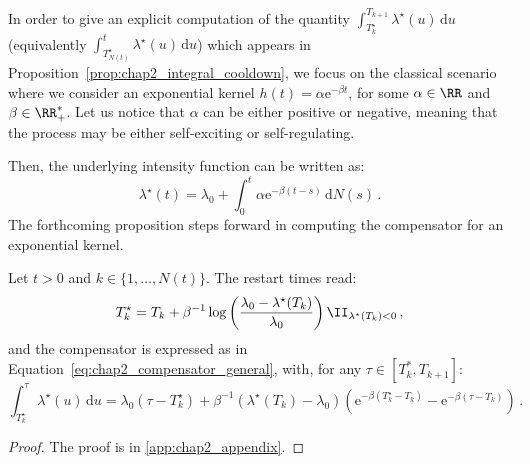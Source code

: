 In order to give an explicit computation of the quantity $\int_{T_{k}^\star}^{T_{k+1}}{\lambda^\star(u)\,\mathrm{d}u}$ (equivalently $\int_{T_{N(t)}^\star}^{t}{\lambda^\star(u)\,\mathrm{d}u}$) which appears in Proposition~\ref{prop:chap2_integral_cooldown}, we focus on the classical scenario where we consider an exponential kernel $h(t) = \alpha \mathrm{e}^{-\beta t}$, for some $\alpha\in\RR$ and $\beta\in\RR_+^*$.
Let us notice that $\alpha$ can be either positive or negative, meaning that the process may be either self-exciting or self-regulating.

Then, the underlying intensity function can be written as:
\begin{equation}\label{eq:chap2_exponential_intensity}
    \lambda^\star(t) = \lambda_0 + \int_{0}^{t}{\alpha \mathrm{e}^{-\beta(t-s)}\,\mathrm{d}N(s)}\,.
\end{equation}
The forthcoming proposition steps forward in computing the compensator for an exponential kernel.

\begin{proposition}
Let $t > 0$ and $k \in \{1, \dots, N(t)\}$.
The restart times read:
\[
    T_k^\star = T_k + \beta^{-1} \log \left({\frac{\lambda_0 - \lambda^\star(T_k)}{\lambda_0}} \right) \II_{\lambda^\star(T_k) < 0}\,,
\]
and the compensator is expressed as in Equation~\eqref{eq:chap2_compensator_general}, with,
for any $\tau \in [T_{k}^*, T_{k+1}]$:
\[
    \int_{T_{k}^\star}^{\tau}{\lambda^\star(u)\,\mathrm{d}u}
    = \lambda_0(\tau - T_{k}^\star) + \beta^{-1} (\lambda^\star(T_{k}) - \lambda_0) (\mathrm{e}^{-\beta(T_{k}^\star-T_{k})}-\mathrm{e}^{-\beta(\tau-T_{k})})\,.
\]

\label{prop:chap2_exp}
\end{proposition}
\begin{proof}
The proof is in \ref{app:chap2_appendix}.
\end{proof}

